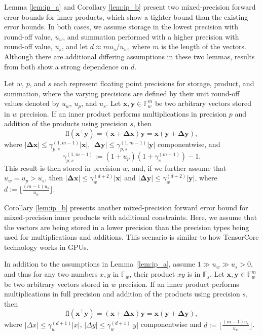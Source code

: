 \documentclass[review,onefignum,onetabnum]{siamart190516}
\newcommand{\F}{\mathbb{F}}
\newcommand{\bb}[1]{\mathbf{#1}}
\newcommand{\fl}{\mathrm{fl}}
\begin{document}
Lemma \ref{lem:ip_a} and Corollary \ref{lem:ip_b} present two mixed-precision forward error bounds for inner products, which show a tighter bound than the existing error bounds. 
In both cases, we assume storage in the lowest precision with round-off value, $u_w$, and summation performed with a higher precision with round-off value, $u_s$, and let $d \approx m u_s / u_w$,
where $m$ is the length of the vectors. 
Although there are additional differing assumptions in these two lemmas, results from both show a strong dependence on $d$.
\begin{lemma}
	\label{lem:ip_a}
	Let $w$, $p$, and $s$ each represent floating point precisions for storage, product, and summation, where the varying precisions are defined by their unit round-off values denoted by $u_w$, $u_p$, and $u_s$.
	Let $\bb{x},\bb{y}\in \F_w^{m}$ be two arbitrary vectors stored in $w$ precision.
	If an inner product performs multiplications in precision $p$ and addition of the products using precision $s$, then
	\begin{equation}
	\fl(\bb{x}^{\top}\bb{y}) = (\bb{x}+\bb{\Delta x}) \bb{y} = \bb{x}(\bb{y}+\bb{\Delta y}),
	\end{equation}
	where $|\bb{\Delta x}|\leq \gamma_{p,s}^{(1,m-1)}|\bb{x}|$, $|\bb{\Delta y}|\leq \gamma_{p,s}^{(1,m-1)}|\bb{y}|$ componentwise, and $$\gamma_{p,s}^{(1,m-1)} := (1+u_p)(1+\gamma_s^{(m-1)})-1.$$
	This result is then stored in precision $w$, and, if we further assume that $u_w=u_p>u_s$, then $|\bb{\Delta x}|\leq \gamma_w^{(d+2)}|\bb{x}|$ and $|\bb{\Delta y}|\leq \gamma_w^{(d+2)}|\bb{y}|$, where $d:=\lfloor\frac{(m-1)u_s}{u_w}\rfloor$.
\end{lemma}

Corollary \ref{lem:ip_b} presents another mixed-precision forward error bound for mixed-precision inner products with additional constraints.
Here, we assume that the vectors are being stored in a lower precision than the precision types being used for multiplications and additions.
This scenario is similar to how TensorCore technology works in GPUs.

\begin{corollary}
	\label{lem:ip_b}
	In addition to the assumptions in Lemma~\ref{lem:ip_a}, assume $1\gg u_w \gg u_s>0$, and thus for any two numbers $x,y$ in $\F_w$, their product $xy$ is in $\F_s$.
	Let $\bb{x},\bb{y}\in \F_w^m$ be two arbitrary vectors stored in $w$ precision.
	If an inner product performs multiplications in full precision and addition of the products using precision $s$, then
	\begin{equation}
	\fl(\bb{x}^{\top}\bb{y}) = (\bb{x}+\bb{\Delta x}) \bb{y} = \bb{x}(\bb{y}+\bb{\Delta y}),
	\end{equation}
	where $|\Delta x|\leq \gamma_w^{(d+1)}|x|$, $|\Delta y|\leq \gamma_w^{(d+1)}|y|$ componentwise and $d:=\lfloor\frac{(m-1)u_s}{u_w}\rfloor$.
\end{corollary}
\end{document}
